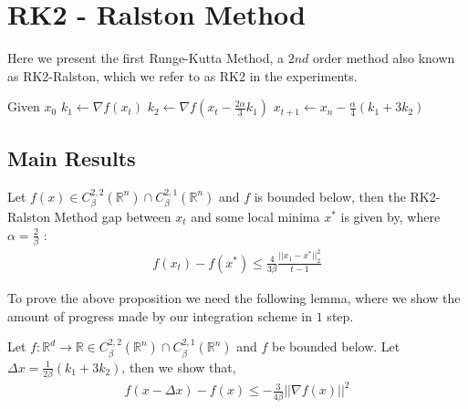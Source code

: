 \section{RK2 - Ralston Method}

Here we present the first Runge-Kutta Method, a $2nd$ order method also known as RK2-Ralston, which we refer to as RK2 in the experiments.

\begin{algorithmic}
\STATE Given $x_0$
  \STATE $k_1 \gets \nabla f(x_t)$
  \STATE $k_2 \gets \nabla f(x_t - \frac{2\alpha}{3} k_1) $
  \STATE $x_{t+1} \gets x_n - \frac{\alpha}{4}(k_1 + 3 k_2)$
\ENDFOR
\end{algorithmic}

\subsection{Main Results}
\begin{thm} Let $f(x) \in C_{\beta}^{2,2}( \mathbb{R}^n) \cap  C_{\beta}^{2,1}( \mathbb{R}^n)$ and $f$ is bounded below, then the RK2-Ralston Method gap between $x_t$ and some local minima $x^*$ is given by, where $\alpha = \frac{2}{\beta}$ :
\begin{align*}
f(x_t) - f(x^*) \leq \frac{4}{3 \beta} \frac{ || x_1 - x^* ||_2^2}{t-1}
\end{align*}
\end{thm}

To prove the above proposition we need the following lemma, where we show the amount of progress made by our integration scheme in $1$ step.
\begin{lemma}
Let $f : \mathbb{R}^d \rightarrow \mathbb{R} \in C_{\beta}^{2,2}( \mathbb{R}^n) \cap  C_{\beta}^{2,1}(\mathbb{R}^n)$ and $f$ be bounded below. Let $\Delta x =  \frac{1}{2\beta}(k_1 + 3k_2)$, then  we show that,
\begin{align}
f(x - \Delta x ) - f(x) \leq - \frac{3}{4 \beta} || \nabla f(x) ||^2
\end{align}
\end{lemma}


